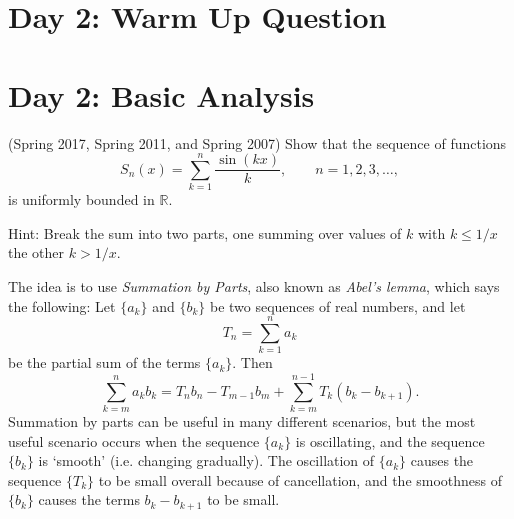 \documentclass{exam}
\theoremstyle{problemstyle}
\newcommand{\1}[1]{\textbf{1}_{\left[#1\right]}} %
\def\R{\mathbb{R}} %
\def\blue{\color{Blue}}
\newcommand{\bnote}[1]{{\blue#1}} %
\begin{document}
\begin{questions}
\newpage
\section*{Day 2: Warm Up Question}

\newpage
\section{Day 2: Basic Analysis}

\question (Spring 2017, Spring 2011, and Spring 2007)
Show that the sequence of functions
  \begin{equation*}
    S_n(x)= \sum_{k=1}^{n}\frac{\sin(kx)}{k}, \quad \quad n=1,2,3,\ldots,
  \end{equation*}
  is uniformly bounded in $\R$.

\bnote{Hint: Break the sum into two parts, one summing over values of $k$ with $k \leq 1/x$ the other $k > 1/x$.}
\begin{solution}
The idea is to use \emph{Summation by Parts}, also known as \emph{Abel's lemma}, which says the following: Let $\{ a_k \}$ and $\{ b_k \}$ be two sequences of real numbers, and let
%
\[ T_n = \sum_{k = 1}^n a_k \]
%
be the partial sum of the terms $\{ a_k \}$. Then
%
\[ \sum_{k = m}^n a_k b_k = T_n b_n - T_{m-1} b_m + \sum_{k = m}^{n-1} T_k (b_k - b_{k+1}). \]
%
Summation by parts can be useful in many different scenarios, but the most useful scenario occurs when the sequence $\{ a_k \}$ is oscillating, and the sequence $\{ b_k \}$ is `smooth' (i.e. changing gradually). The oscillation of $\{ a_k \}$ causes the sequence $\{ T_k \}$ to be small overall because of cancellation, and the smoothness of $\{ b_k \}$ causes the terms $b_k - b_{k+1}$ to be small.


\end{solution}
\end{questions}
\end{document}
